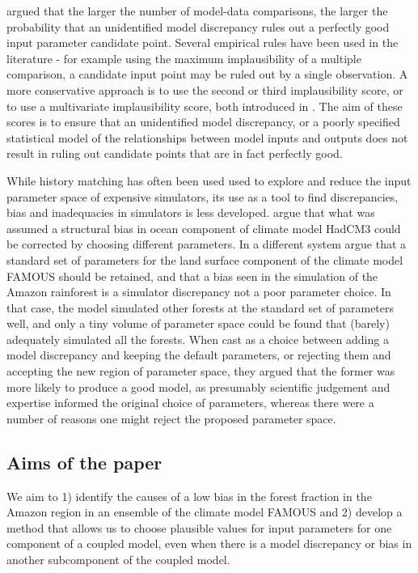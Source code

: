 \documentclass[gmd, manuscript]{copernicus}
\begin{document}
 \cite{mcneall2016impact} argued that the larger the number of model-data comparisons, the larger the probability that an unidentified model discrepancy rules out a perfectly good input parameter candidate point. Several empirical rules have been used in the literature - for example using the maximum implausibility of a multiple comparison, a candidate input point may be ruled out by a single observation. A more conservative approach is to use the second or third implausibility score, or to use a multivariate implausibility score, both introduced in \cite{vernon2010galaxy}. The aim of these scores is to ensure that an unidentified model discrepancy, or a poorly specified statistical model of the relationships between model inputs and outputs does not result in ruling out candidate points that are in fact perfectly good.   

While history matching has often been used used to explore and reduce the input parameter space of expensive simulators, its use as a tool to find discrepancies, bias and inadequacies in simulators is less developed. \cite{williamson2015identifying} argue that what was assumed a structural bias in ocean component of climate model HadCM3 could be corrected by choosing different parameters. In a different system \cite{mcneall2016impact} argue that a standard set of parameters for the land surface component of the climate model FAMOUS should be retained, and that a bias seen in the simulation of the Amazon rainforest is a simulator discrepancy not a poor parameter choice. In that case, the model simulated other forests at the standard set of parameters well, and only a tiny volume of parameter space could be found that (barely) adequately simulated all the forests. When cast as a choice between adding a model discrepancy and keeping the default parameters, or rejecting them and accepting the new region of parameter space, they argued that the former was more likely to produce a good model, as presumably scientific judgement and expertise informed the original choice of parameters, whereas there were a number of reasons one might reject the proposed parameter space. 


\subsection{Aims of the paper}

We aim to 1) identify the causes of a low bias in the forest fraction in the Amazon region in an ensemble of the climate model FAMOUS and 2) develop a method that allows us to choose plausible values for input parameters for one component of a coupled model, even when there is a model discrepancy or bias in another subcomponent of the coupled model.
\end{document}
